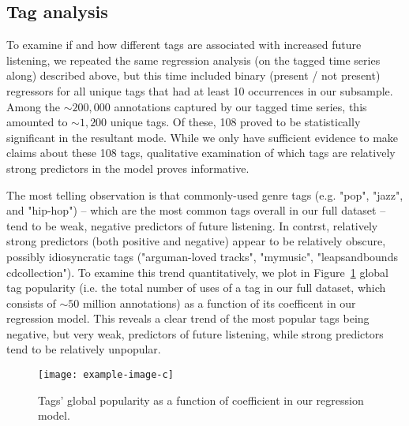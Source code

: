 \subsection{Tag analysis}
To examine if and how different tags are associated with increased future listening, we repeated the same regression analysis (on the tagged time series along) described above, but this time included binary (present / not present) regressors for all unique tags that had at least 10 occurrences in our subsample. Among the $\sim200,000$ annotations captured by our tagged time series, this amounted to $\sim1,200$ unique tags. Of these, 108 proved to be statistically significant  in the resultant mode. While we only have sufficient evidence to make claims about these 108 tags, qualitative examination of which tags are relatively strong predictors in the model proves informative. 

The most telling observation is that commonly-used genre tags (e.g. "pop", "jazz", and "hip-hop") -- which are the most common tags overall in our full dataset -- tend to be weak, negative predictors of future listening. In contrst, relatively strong predictors (both positive and negative) appear to be relatively obscure, possibly idiosyncratic tags ("arguman-loved tracks", "mymusic", "leapsandbounds cdcollection"). To examine this trend quantitatively, we plot in Figure~\ref{fig:coefVsPopularity} global tag popularity (i.e. the total number of uses of a tag in our full dataset, which consists of $\sim 50$ million annotations) as a function of its coefficent in our regression model. This reveals a clear trend of the most popular tags being negative, but very weak, predictors of future listening, while strong predictors tend to be relatively unpopular.

  \begin{figure}
	\centering
      \texttt{[image: example-image-c]}
    \caption{Tags' global popularity as a function of coefficient in our regression model.}
    \label{fig:coefVsPopularity}
  \end{figure} 


